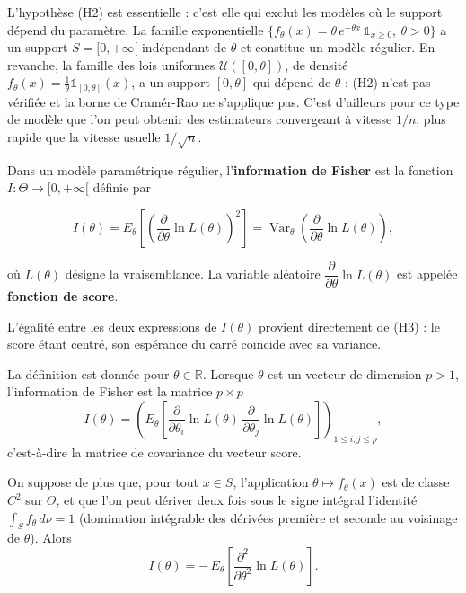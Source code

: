 \begin{remarque}
L'hypothèse (H2) est essentielle : c'est elle qui exclut les modèles où le support
dépend du paramètre. La famille exponentielle
$\{f_\theta(x) = \theta\, e^{-\theta x}\,\mathbb{1}_{x \geq 0},\ \theta > 0\}$ a un
support $S = [0, +\infty[$ indépendant de $\theta$ et constitue un modèle régulier.
En revanche, la famille des lois uniformes $\mathcal{U}([0,\theta])$, de densité
$f_\theta(x) = \frac{1}{\theta}\mathbb{1}_{[0,\theta]}(x)$, a un support
$[0,\theta]$ qui dépend de $\theta$ : (H2) n'est pas vérifiée et la borne de
Cramér-Rao ne s'applique pas. C'est d'ailleurs pour ce type de modèle que l'on peut
obtenir des estimateurs convergeant à vitesse $1/n$, plus rapide que la vitesse
usuelle $1/\sqrt{n}$.
\end{remarque}

\begin{mdframed}
\begin{definition}
Dans un modèle paramétrique régulier, l'\textbf{information de Fisher} est la fonction $I : \Theta \to [0, +\infty[$ définie par

$$
  I(\theta)
  = E_\theta\!\left[ \left( \frac{\partial}{\partial\theta} \ln L(\theta) \right)^{2} \right]
  = \operatorname{Var}_\theta\!\left( \frac{\partial}{\partial\theta} \ln L(\theta) \right),
$$

où $L(\theta)$ désigne la vraisemblance. La variable aléatoire
$\dfrac{\partial}{\partial\theta} \ln L(\theta)$ est appelée \textbf{fonction de
score}.
\end{definition}
\end{mdframed}

L'égalité entre les deux expressions de $I(\theta)$ provient directement de (H3) :
le score étant centré, son espérance du carré coïncide avec sa variance.

\begin{remarque}
La définition est donnée pour $\theta \in \mathbb{R}$. Lorsque $\theta$ est un
vecteur de dimension $p > 1$, l'information de Fisher est la matrice $p \times p$
\[
  I(\theta)
  = \left( E_\theta\!\left[ \frac{\partial}{\partial\theta_i} \ln L(\theta)\,
    \frac{\partial}{\partial\theta_j} \ln L(\theta) \right] \right)_{1 \leq i,j \leq p},
\]
c'est-à-dire la matrice de covariance du vecteur score.
\end{remarque}

\begin{proposition}
On suppose de plus que, pour tout $x \in S$, l'application
$\theta \mapsto f_\theta(x)$ est de classe $C^2$ sur $\Theta$, et que l'on peut
dériver deux fois sous le signe intégral l'identité $\int_S f_\theta\, d\nu = 1$
(domination intégrable des dérivées première et seconde au voisinage de $\theta$).
Alors
\[
  I(\theta) = -\, E_\theta\!\left[ \frac{\partial^{2}}{\partial\theta^{2}} \ln L(\theta) \right].
\]
\end{proposition}

